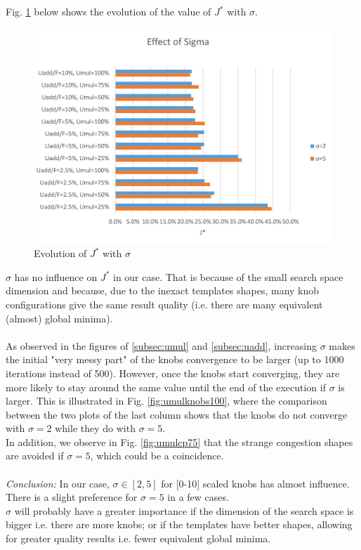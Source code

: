 Fig. \ref{fig:sigma} below shows the evolution of the value of $J^{*}$ with $\sigma$.\\
\begin{figure}[h]
	\label{fig:sigma}
	\caption{Evolution of $J^{*}$ with $\sigma$}
	\includegraphics[width=7in]{figures/sigma.png}
\end{figure}
$\sigma$ has no influence on $J^{*}$ in our case. That is because of the small search space dimension and because, due to the inexact templates shapes, many knob configurations give the same result quality (i.e. there are many equivalent (almost) global minima).\\
\\
As observed in the figures of \ref{subsec:umul} and \ref{subsec:uadd}, increasing $\sigma$ makes the initial  "very messy part" of the knobs convergence to be larger (up to 1000 iterations instead of 500). However, once the knobs start converging, they are more likely to stay around the same value until the end of the execution if $\sigma$ is larger. This is illustrated in Fig. \ref{fig:umulknobs100}, where the comparison between the two plots of the last column shows that the knobs do not converge with $\sigma=2$ while they do with $\sigma=5$.\\
In addition, we observe in Fig. \ref{fig:umulcp75} that the strange congestion shapes are avoided if $\sigma=5$, which could be a coincidence.\\
\\
\emph{Conclusion:} In our case, $\sigma \in [2,5]$ for [0-10] scaled knobs has almost influence. There is a slight preference for $\sigma=5$ in a few cases. \\
$\sigma$ will probably have a greater importance if the dimension of the search space is bigger i.e. there are more knobs; or if the templates have better shapes, allowing for greater quality results i.e. fewer equivalent global minima.